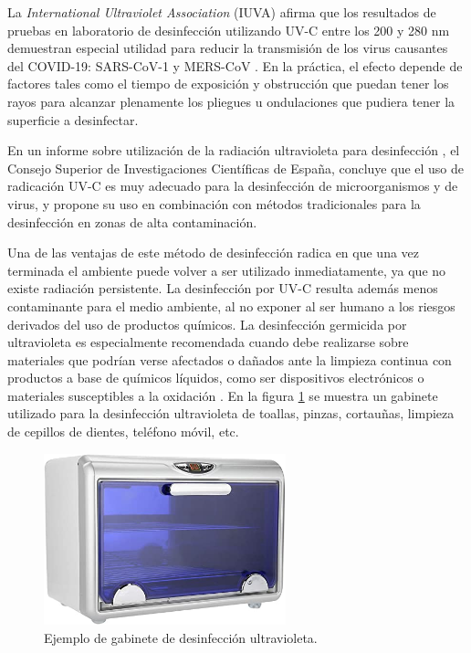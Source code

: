 La \emph{International Ultraviolet Association}  (IUVA) afirma que los resultados de pruebas en laboratorio de desinfección utilizando UV-C entre los 200 y 280 nm demuestran especial utilidad para reducir la transmisión de los virus causantes del COVID-19:  SARS-CoV-1 y MERS-CoV \citep{IUA}. En la práctica, el efecto depende de factores tales como  el tiempo de exposición y obstrucción que puedan tener los rayos para alcanzar plenamente los pliegues u ondulaciones que pudiera tener la superficie a desinfectar. 

En un informe sobre utilización de la radiación ultravioleta para desinfección \citep{CSIC}, el Consejo Superior de Investigaciones Científicas de España, concluye que el uso de radicación UV-C es muy adecuado para la desinfección de microorganismos y de virus, y propone su uso en combinación con métodos tradicionales para la desinfección en  zonas de alta contaminación.

Una de las ventajas de este método de desinfección radica en que una vez terminada el ambiente puede volver a ser utilizado inmediatamente, ya que no existe radiación persistente. La desinfección  por UV-C resulta además menos contaminante para el medio ambiente, al no exponer al ser humano a los riesgos derivados del uso de productos químicos. La desinfección germicida por ultravioleta es especialmente recomendada cuando debe realizarse sobre materiales que podrían verse afectados o dañados ante la limpieza continua con productos a base de químicos líquidos, como ser dispositivos electrónicos o materiales susceptibles a la  oxidación \citep{interior}. En la figura \ref{fig:gabineteuv} se muestra un gabinete utilizado para la desinfección ultravioleta de toallas, pinzas, cortauñas, limpieza de cepillos de dientes, teléfono móvil, etc.
\vspace{12mm}

\begin{figure}[h]
	\centering
	\includegraphics[width=7cm]{./Figures/gabineteuv.jpg}
	\caption{Ejemplo de gabinete de desinfección ultravioleta.}
	\label{fig:gabineteuv}
\end{figure}




